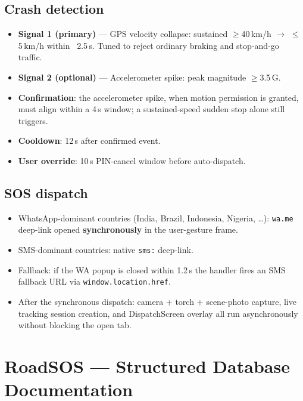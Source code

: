 \documentclass[11pt, a4paper]{article}
\newcommand{\code}[1]{\texttt{\small#1}}
\begin{document}
\subsection{Crash detection}

\begin{itemize}
  \item \textbf{Signal 1 (primary)} --- GPS velocity collapse: sustained $\geq$40\,km/h $\to$
        $\leq$5\,km/h within ~2.5\,s. Tuned to reject ordinary braking and stop-and-go traffic.
  \item \textbf{Signal 2 (optional)} --- Accelerometer spike: peak magnitude $\geq$3.5\,G.
  \item \textbf{Confirmation}: the accelerometer spike, when motion permission is granted, must align within a 4\,s window; a sustained-speed sudden stop alone still triggers.
  \item \textbf{Cooldown}: 12\,s after confirmed event.
  \item \textbf{User override}: 10\,s PIN-cancel window before auto-dispatch.
\end{itemize}

\subsection{SOS dispatch}

\begin{itemize}
  \item WhatsApp-dominant countries (India, Brazil, Indonesia, Nigeria, \ldots):
        \code{wa.me} deep-link opened \textbf{synchronously} in the user-gesture frame.
  \item SMS-dominant countries: native \code{sms:} deep-link.
  \item Fallback: if the WA popup is closed within 1.2\,s the handler fires an
        SMS fallback URL via \code{window.location.href}.
  \item After the synchronous dispatch: camera + torch + scene-photo capture,
        live tracking session creation, and DispatchScreen overlay all run
        asynchronously without blocking the open tab.
\end{itemize}


\section{RoadSOS --- Structured Database Documentation}
\end{document}
